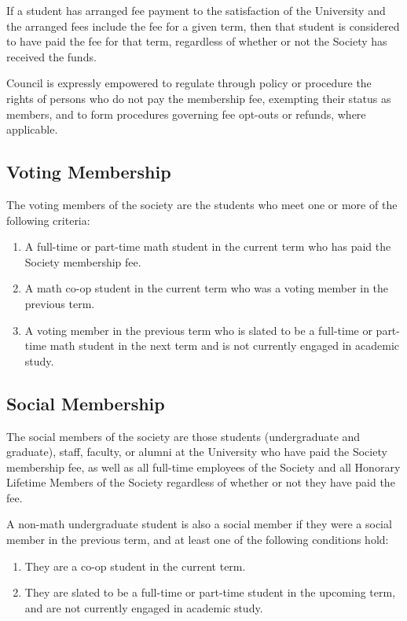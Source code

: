 If a student has arranged fee payment to the satisfaction of the University and
the arranged fees include the fee for a given term, then that student is
considered to have paid the fee for that term, regardless of whether or not the
Society has received the funds.

Council is expressly empowered to regulate through policy or procedure the rights of
persons who do not pay the membership fee, exempting their status as members, and to form
procedures governing fee opt-outs or refunds, where applicable.

\subsection{Voting Membership}
The voting members of the society are the students who meet one or more
of the following criteria:
\begin{enumerate}
  \item A full-time or part-time math student in the current term who has paid the Society membership fee. 
  \item A math co-op student in the current term who was a voting member in the
    previous term.
  \item A voting member in the previous term who is slated to be a full-time or
    part-time math student in the next term and is not currently engaged in
    academic study.
\end{enumerate}

\subsection{Social Membership}
The social members of the society are those students (undergraduate and
graduate), staff, faculty, or alumni at the University who have paid the Society
membership fee, as well as all full-time employees of the Society and all
Honorary Lifetime Members of the Society regardless of whether or not they have
paid the fee.

A non-math undergraduate student is also a social member if they were a social member in the previous term, and at least one of the following conditions hold:
\begin{enumerate}
	\item They are a co-op student in the current term.
	\item They are slated to be a full-time or part-time student in the upcoming term, and are not currently engaged in academic study.
\end{enumerate}

